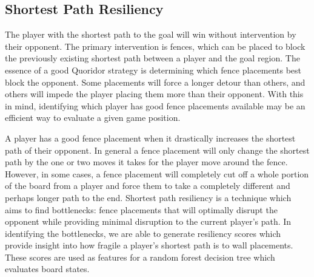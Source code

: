 \documentclass[10pt]{article}
\begin{document}
\subsection{Shortest Path Resiliency}

The player with the shortest path to the goal will win without intervention by their opponent. The primary intervention is fences, which can be placed to block the previously existing shortest path between a player and the goal region. The essence of a good Quoridor strategy is determining which fence placements best block the opponent. Some placements will force a longer detour than others, and others will impede the player placing them more than their opponent. With this in mind, identifying which player has good fence placements available may be an efficient way to evaluate a given game position.  

A player has a good fence placement when it drastically increases the shortest path of their opponent. In general a fence placement will only change the shortest path by the one or two moves it takes for the player move around the fence. However, in some cases, a fence placement will completely cut off a whole portion of the board from a player and force them to take a completely different and perhaps longer path to the end. Shortest path resiliency is a technique which aims to find bottlenecks: fence placements that will optimally disrupt the opponent while providing minimal disruption to the current player's path. In identifying the bottlenecks, we are able to generate resiliency scores which provide insight into how fragile a player's shortest path is to wall placements. These scores are used as features for a random forest decision tree which evaluates board states.
\end{document}
